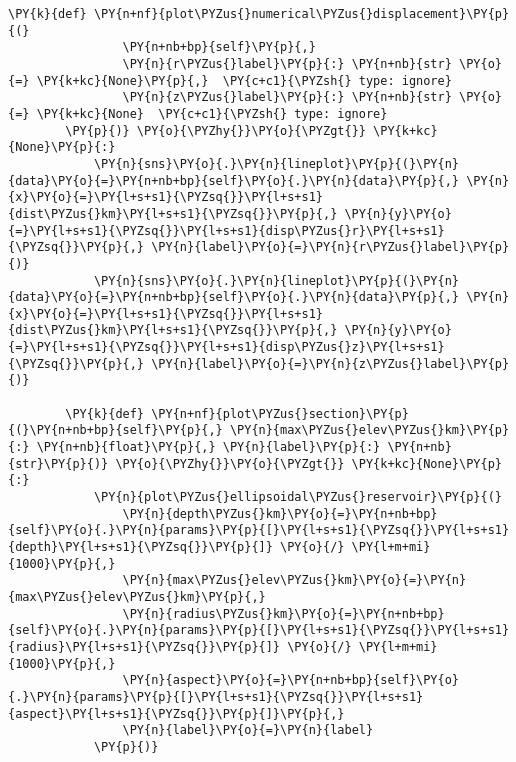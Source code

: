 \begin{tcolorbox}[breakable, size=fbox, boxrule=1pt, pad at break*=1mm,colback=cellbackground, colframe=cellborder]
\begin{Verbatim}[commandchars=\\\{\}]
        \PY{k}{def} \PY{n+nf}{plot\PYZus{}numerical\PYZus{}displacement}\PY{p}{(}
                \PY{n+nb+bp}{self}\PY{p}{,}
                \PY{n}{r\PYZus{}label}\PY{p}{:} \PY{n+nb}{str} \PY{o}{=} \PY{k+kc}{None}\PY{p}{,}  \PY{c+c1}{\PYZsh{} type: ignore}
                \PY{n}{z\PYZus{}label}\PY{p}{:} \PY{n+nb}{str} \PY{o}{=} \PY{k+kc}{None}  \PY{c+c1}{\PYZsh{} type: ignore}
        \PY{p}{)} \PY{o}{\PYZhy{}}\PY{o}{\PYZgt{}} \PY{k+kc}{None}\PY{p}{:}
            \PY{n}{sns}\PY{o}{.}\PY{n}{lineplot}\PY{p}{(}\PY{n}{data}\PY{o}{=}\PY{n+nb+bp}{self}\PY{o}{.}\PY{n}{data}\PY{p}{,} \PY{n}{x}\PY{o}{=}\PY{l+s+s1}{\PYZsq{}}\PY{l+s+s1}{dist\PYZus{}km}\PY{l+s+s1}{\PYZsq{}}\PY{p}{,} \PY{n}{y}\PY{o}{=}\PY{l+s+s1}{\PYZsq{}}\PY{l+s+s1}{disp\PYZus{}r}\PY{l+s+s1}{\PYZsq{}}\PY{p}{,} \PY{n}{label}\PY{o}{=}\PY{n}{r\PYZus{}label}\PY{p}{)}
            \PY{n}{sns}\PY{o}{.}\PY{n}{lineplot}\PY{p}{(}\PY{n}{data}\PY{o}{=}\PY{n+nb+bp}{self}\PY{o}{.}\PY{n}{data}\PY{p}{,} \PY{n}{x}\PY{o}{=}\PY{l+s+s1}{\PYZsq{}}\PY{l+s+s1}{dist\PYZus{}km}\PY{l+s+s1}{\PYZsq{}}\PY{p}{,} \PY{n}{y}\PY{o}{=}\PY{l+s+s1}{\PYZsq{}}\PY{l+s+s1}{disp\PYZus{}z}\PY{l+s+s1}{\PYZsq{}}\PY{p}{,} \PY{n}{label}\PY{o}{=}\PY{n}{z\PYZus{}label}\PY{p}{)}
    
        \PY{k}{def} \PY{n+nf}{plot\PYZus{}section}\PY{p}{(}\PY{n+nb+bp}{self}\PY{p}{,} \PY{n}{max\PYZus{}elev\PYZus{}km}\PY{p}{:} \PY{n+nb}{float}\PY{p}{,} \PY{n}{label}\PY{p}{:} \PY{n+nb}{str}\PY{p}{)} \PY{o}{\PYZhy{}}\PY{o}{\PYZgt{}} \PY{k+kc}{None}\PY{p}{:}
            \PY{n}{plot\PYZus{}ellipsoidal\PYZus{}reservoir}\PY{p}{(}
                \PY{n}{depth\PYZus{}km}\PY{o}{=}\PY{n+nb+bp}{self}\PY{o}{.}\PY{n}{params}\PY{p}{[}\PY{l+s+s1}{\PYZsq{}}\PY{l+s+s1}{depth}\PY{l+s+s1}{\PYZsq{}}\PY{p}{]} \PY{o}{/} \PY{l+m+mi}{1000}\PY{p}{,}
                \PY{n}{max\PYZus{}elev\PYZus{}km}\PY{o}{=}\PY{n}{max\PYZus{}elev\PYZus{}km}\PY{p}{,}
                \PY{n}{radius\PYZus{}km}\PY{o}{=}\PY{n+nb+bp}{self}\PY{o}{.}\PY{n}{params}\PY{p}{[}\PY{l+s+s1}{\PYZsq{}}\PY{l+s+s1}{radius}\PY{l+s+s1}{\PYZsq{}}\PY{p}{]} \PY{o}{/} \PY{l+m+mi}{1000}\PY{p}{,}
                \PY{n}{aspect}\PY{o}{=}\PY{n+nb+bp}{self}\PY{o}{.}\PY{n}{params}\PY{p}{[}\PY{l+s+s1}{\PYZsq{}}\PY{l+s+s1}{aspect}\PY{l+s+s1}{\PYZsq{}}\PY{p}{]}\PY{p}{,}
                \PY{n}{label}\PY{o}{=}\PY{n}{label}
            \PY{p}{)}
    

\end{Verbatim}
\end{tcolorbox}
